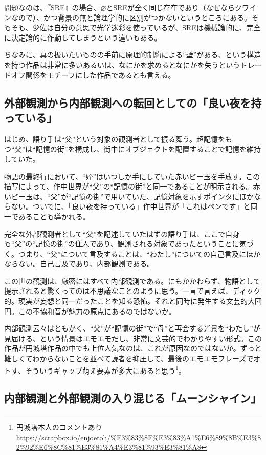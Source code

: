 \documentclass[10pt, a5paper, twoside]{jsarticle}
\begin{document}
			問題なのは、『SRE』の場合、$ \varnothing $とSREが全く同じ存在であり（なぜならクワインなので）、かつ背景の無と論理学的に区別がつかないというところにある。そもそも、少佐は自分の意思で光学迷彩を使っているが、SREは機械論的に、完全に決定論的に作動してしまうという違いもある。

			ちなみに、真の扱いたいものの手前に原理的制約による“壁”がある、という構造を持つ作品は非常に多いあるいは、なにかを求めるとなにかを失うというトレードオフ関係をモチーフにした作品であるとも言える。

		\subsection{外部観測から内部観測への転回としての「良い夜を持っている」}

			はじめ、語り手は“父”という対象の観測者として振る舞う。超記憶をもつ“父”は“記憶の街”を構成し、街中にオブジェクトを配置することで記憶を維持していた。

			物語の最終行において、“姪”はいつしか手にしていた赤いビー玉を手放す。この描写によって、作中世界が“父”の“記憶の街”と同一であることが明示される。赤いビー玉は、“父”が“記憶の街”で用いていた、記憶対象を示すポインタにほかならない。ついでに、「良い夜を持っている」作中世界が「これはペンです」と同一であることも導かれる。

			完全な外部観測者として“父”を記述していたはずの語り手は、ここで自身も“父”の“記憶の街”の住人であり、観測される対象であったということに気づく。つまり、“父”について言及することは、“わたし”についての自己言及にほかならない。自己言及であり、内部観測である。

			この世の観測は、厳密にはすべて内部観測である。にもかかわらず、物語として提示されると驚くってのは不思議なことのように思う。一言で言えば、ディック的。現実が妄想と同一だったことを知る恐怖。それと同時に発生する文芸的大団円。この不協和音が魅力の原点にあるのではないか。

			内部観測云々はともかく、“父”が“記憶の街”で“母”と再会する光景を“わたし”が見届ける、という情景はエモエモだし、非常に文芸的でわかりやすい形式。この作品が円城塔作品の中でも上位人気なのは、これが原因なのではないか。ずっと難しくてわからないことを並べて読者を抑圧して、最後のエモエモフレーズでオトす、そういうギャップ萌え要素が多大にあると思う\footnote{円城塔本人のコメントあり \\ \url{https://scrapbox.io/enjoetoh/%E3%83%8F%E3%83%A1%E6%89%8B%E3%82%92%E6%8C%81%E3%81%A4%E3%81%93%E3%81%A8}}。

		\subsection{内部観測と外部観測の入り混じる「ムーンシャイン」}
\end{document}
